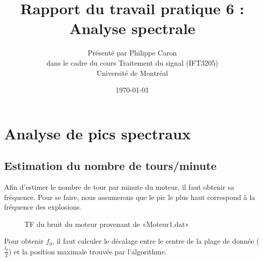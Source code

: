 \documentclass[11pt]{article}
\title{Rapport du travail pratique 6 : Analyse spectrale}
\date{\today}
\author{Présenté par Philippe Caron\\dans le cadre du cours Traitement du signal (IFT3205)\\Université de Montréal}
\begin{document}
\begin{titlepage}
  \maketitle
  \thispagestyle{empty}
\end{titlepage}

\setcounter{section}{1}
\section{Analyse de pics spectraux}
\subsection{Estimation du nombre de tours/minute}
Afin d'estimer le nombre de tour par minute du moteur, il faut obtenir sa fréquence. Pour se faire, nous assumerons que le pic le plus haut correspond à la fréquence des explosions.

\vspace{1cm}

\begin{figure}[ht]
  \centering
  \caption{TF du bruit du moteur provenant de «Moteur1.dat»}
\end{figure}

\vspace{1cm}

Pour obtenir $f_0$, il faut calculer le décalage entre le centre de la plage de donnée ($\frac{l_p}{2}$) et la position maximale trouvée par l'algorithme.
\end{document}
